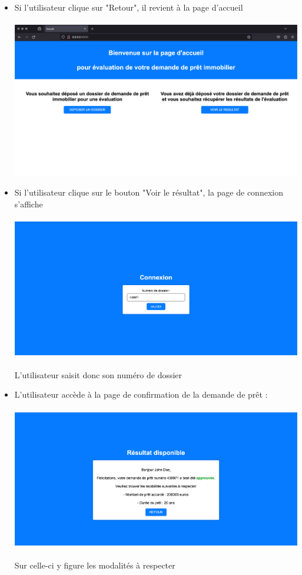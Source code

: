 \documentclass{article}
\begin{document}
\begin{itemize}
		\item Si l'utilisateur clique sur "Retour", il revient à la page d'accueil \\
		\\
		\includegraphics[width=\textwidth]{images/accueil.png}
		
		\item Si l'utilisateur clique sur le bouton "Voir le résultat", la page de connexion s'affiche \\
		\\
	   \includegraphics[width=\textwidth]{images/connexiona.png}  \\
	   \\
	   L'utilisateur saisit donc son numéro de dossier 
		
	   \item L'utilisateur accède à la page de confirmation de la demande de prêt : \\
	   \\
	   \includegraphics[width=\textwidth]{images/confirmationa.png} \\
	   \\
	   Sur celle-ci y figure les modalités à respecter
	   

\end{itemize}
\end{document}
